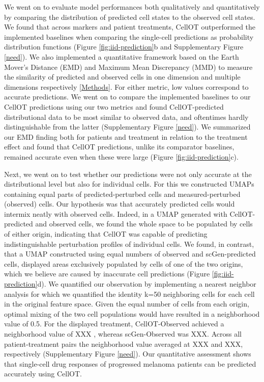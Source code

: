 We went on to evaluate model performances both qualitatively and quantitatively by comparing the distribution of predicted cell states to the observed cell states.
We found that across markers and patient treatments, CellOT outperformed the implemented baselines when comparing the single-cell predictions as probability distribution functions (Figure \ref{fig:iid-prediction}b and Supplementary Figure \ref{need}).
We also implemented a quantitative framework based on the Earth Mover’s Distance (EMD) \cite{need} and Maximum Mean Discrepancy (MMD) \cite{need} to measure the similarity of predicted and observed cells in one dimension and multiple dimensions respectively \ref{Methods}.
For either metric, low values correspond to accurate predictions.
We went on to compare the implemented baselines to our CellOT predictions using our two metrics and found CellOT-predicted distributional data to be most similar to observed data, and oftentimes hardly distinguishable from the latter (Supplementary Figure \ref{need}).
We summarized our EMD finding both for patients and treatment in relation to the treatment effect and found that CellOT predictions, unlike its comparator baselines, remained accurate even when these were large (Figure \ref{fig:iid-prediction}c).  

Next, we went on to test whether our predictions were not only accurate at the distributional level but also for individual cells.
 For this we constructed UMAPs containing equal parts of predicted-perturbed cells and measured-perturbed (observed) cells.
 Our hypothesis was that accurately predicted cells would intermix neatly with observed cells.
 Indeed, in a UMAP generated with CellOT-predicted and observed cells, we found the whole space to be populated by cells of either origin, indicating that CellOT was capable of predicting indistinguishable perturbation profiles of individual cells.
 We found, in contrast, that a UMAP constructed using equal numbers of observed and scGen-predicted cells, displayed areas exclusively populated by cells of one of the two origins, which we believe are caused by inaccurate cell predictions (Figure \ref{fig:iid-prediction}d).
 We quantified our observation by implementing a nearest neighbor analysis for which we quantified the identity k=50 neighboring cells for each cell in the original feature space.
 Given the equal number of cells from each origin, optimal mixing of the two cell populations would have resulted in a neighborhood value of 0.5. For the displayed treatment, CellOT-Observed achieved a neighborhood value of XXX , whereas scGen-Observed was XXX.
 Across all patient-treatment pairs the neighborhood value averaged at XXX and XXX, respectively (Supplementary Figure \ref{need}).
 Our quantitative assessment shows that single-cell drug responses of progressed melanoma patients can be predicted accurately using CellOT. 

